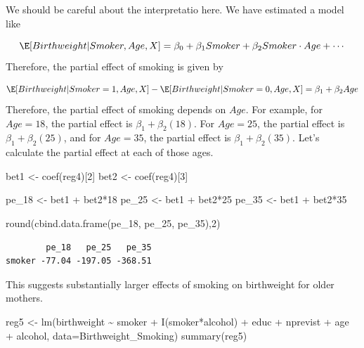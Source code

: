 \documentclass[
  letterpaper,
  DIV=11,
  numbers=noendperiod]{scrreprt}
\newenvironment{Shaded}{\begin{snugshade}}{\end{snugshade}}
\newcommand{\AttributeTok}[1]{\textcolor[rgb]{0.40,0.45,0.13}{#1}}
\newcommand{\DecValTok}[1]{\textcolor[rgb]{0.68,0.00,0.00}{#1}}
\newcommand{\FunctionTok}[1]{\textcolor[rgb]{0.28,0.35,0.67}{#1}}
\newcommand{\NormalTok}[1]{\textcolor[rgb]{0.00,0.23,0.31}{#1}}
\newcommand{\OtherTok}[1]{\textcolor[rgb]{0.00,0.23,0.31}{#1}}
\newcommand{\SpecialCharTok}[1]{\textcolor[rgb]{0.37,0.37,0.37}{#1}}
\begin{document}
We should be careful about the interpretatio here. We have estimated a
model like

\[
  \E[Birthweight|Smoker, Age, X] = \beta_0 + \beta_1 Smoker + \beta_2 Smoker \cdot Age + \cdots
\] Therefore, the partial effect of smoking is given by

\[
  \E[Birthweight | Smoker=1, Age, X] - \E[Birthweight | Smoker=0, Age, X] = \beta_1 + \beta_2 Age
\] Therefore, the partial effect of smoking depends on \(Age\). For
example, for \(Age=18\), the partial effect is
\(\beta_1 + \beta_2 (18)\). For \(Age=25\), the partial effect is
\(\beta_1 + \beta_2 (25)\), and for \(Age=35\), the partial effect is
\(\beta_1 + \beta_2 (35)\). Let's calculate the partial effect at each
of those ages.

\begin{Shaded}
\begin{Highlighting}[]
\NormalTok{bet1 }\OtherTok{\textless{}{-}} \FunctionTok{coef}\NormalTok{(reg4)[}\DecValTok{2}\NormalTok{]}
\NormalTok{bet2 }\OtherTok{\textless{}{-}} \FunctionTok{coef}\NormalTok{(reg4)[}\DecValTok{3}\NormalTok{]}

\NormalTok{pe\_18 }\OtherTok{\textless{}{-}}\NormalTok{ bet1 }\SpecialCharTok{+}\NormalTok{ bet2}\SpecialCharTok{*}\DecValTok{18}
\NormalTok{pe\_25 }\OtherTok{\textless{}{-}}\NormalTok{ bet1 }\SpecialCharTok{+}\NormalTok{ bet2}\SpecialCharTok{*}\DecValTok{25}
\NormalTok{pe\_35 }\OtherTok{\textless{}{-}}\NormalTok{ bet1 }\SpecialCharTok{+}\NormalTok{ bet2}\SpecialCharTok{*}\DecValTok{35}

\FunctionTok{round}\NormalTok{(}\FunctionTok{cbind.data.frame}\NormalTok{(pe\_18, pe\_25, pe\_35),}\DecValTok{2}\NormalTok{)}
\end{Highlighting}
\end{Shaded}

\begin{verbatim}
        pe_18   pe_25   pe_35
smoker -77.04 -197.05 -368.51
\end{verbatim}

This suggests substantially larger effects of smoking on birthweight for
older mothers.

\begin{Shaded}
\begin{Highlighting}[]
\NormalTok{reg5 }\OtherTok{\textless{}{-}} \FunctionTok{lm}\NormalTok{(birthweight }\SpecialCharTok{\textasciitilde{}}\NormalTok{ smoker }\SpecialCharTok{+} \FunctionTok{I}\NormalTok{(smoker}\SpecialCharTok{*}\NormalTok{alcohol) }\SpecialCharTok{+}\NormalTok{ educ }\SpecialCharTok{+}\NormalTok{ nprevist }\SpecialCharTok{+}\NormalTok{ age }\SpecialCharTok{+}\NormalTok{ alcohol,}
           \AttributeTok{data=}\NormalTok{Birthweight\_Smoking)}
\FunctionTok{summary}\NormalTok{(reg5)}
\end{Highlighting}
\end{Shaded}
\end{document}
